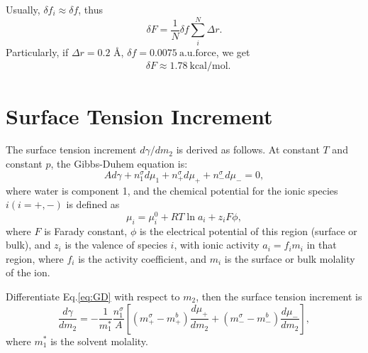 Usually, $\delta{f_i}\approx\delta{f}$, thus
\begin{equation}
  \delta{F} = \frac{1}{N}\delta{f}\sum_{i}^{N}{\Delta{r}}.
\label{eq:dleta_f-2}
\end{equation}
Particularly, if $\Delta{r}= 0.2$ \AA, $\delta{f}=0.0075\ \text{a.u.force}$, we get 
\begin{equation}
\begin{split}
  &\delta{F} \approx 1.78\ \text{kcal/mol}.\nonumber
\end{split}
\label{eq:dleta_f-3}
\end{equation}

\section{Surface Tension Increment}\label{surface_tension_increment}
The surface tension increment $d\gamma/{dm_2}$ is derived as follows.
At constant $T$ and constant $p$, the Gibbs-Duhem equation is: \cite{Pegram2006}
\begin{equation}
Ad\gamma+n_1^{\sigma}d\mu_1 + {n_+^{\sigma}d\mu_+} + {n_-^{\sigma}d\mu_-} =0,
\label{eq:GD}
\end{equation}
where water is component 1, and the chemical potential for the ionic species $i(i=+,-)$ is defined as 
\begin{equation}
\mu_i =\mu_i^0+RT\ln{a}_i+z_iF\phi,
\label{eq:GDb}
\end{equation}
where $F$ is Farady constant, $\phi$ is the electrical potential of this region (surface or bulk), and $z_i$ is the valence of species $i$, with ionic 
activity $a_i=f_im_i$ in that region, where $f_i$ is the activity coefficient, and $m_i$ is the surface or bulk molality of the ion.

Differentiate Eq.\thinspace\ref{eq:GD} with respect to $m_2$, then
the surface tension increment is
\begin{equation}
\frac{d\gamma}{dm_2} = -\frac{1}{m_1^*}\frac{n_1^{\sigma}}{A} [(m_+^{\sigma} -m_+^{b})\frac{d\mu_+}{dm_2} + (m_-^{\sigma} -m_-^b)\frac{d\mu_-}{dm_2}],
\label{eq:h}
\end{equation}
where $m_1^*$ is the solvent molality. 

